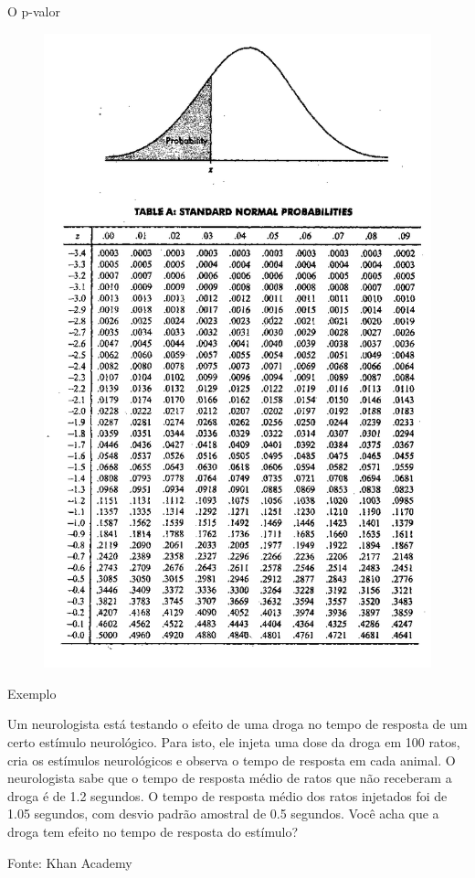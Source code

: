 \documentclass{beamer}
\begin{document}
\begin{frame}{O p-valor}
  \begin{figure}
    \centering
      \includegraphics[height=0.9\textheight]{TH_II/z_table}
  \end{figure}
\end{frame}
  
\begin{frame}{Exemplo}
  \begin{example}
    Um neurologista está testando o efeito de uma droga no tempo de
    resposta de um certo estímulo neurológico. Para isto, ele injeta
    uma dose da droga em \alert{100} ratos, cria os estímulos
    neurológicos e observa o tempo de resposta em cada animal. O
    neurologista sabe que o tempo de resposta médio de ratos que não
    receberam a droga é de \alert{1.2 segundos}. O tempo de resposta
    médio dos ratos injetados foi de \alert{1.05 segundos}, com desvio
    padrão amostral de \alert{0.5 segundos}. Você acha que a droga tem
    efeito no tempo de resposta do estímulo?
  \end{example}
Fonte: Khan Academy
\end{frame}
\end{document}
